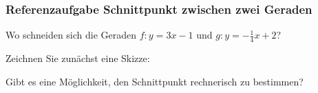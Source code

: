 \subsubsection{Referenzaufgabe Schnittpunkt zwischen zwei Geraden}

Wo schneiden sich die Geraden $f: y=3x - 1$ und $g: y=-\frac{1}{4}x +
2$?

Zeichnen Sie zunächst eine Skizze:



Gibt es eine Möglichkeit, den Schnittpunkt rechnerisch zu bestimmen?

\platzFuerBerechnungenBisEndeSeite{}
\newpage


